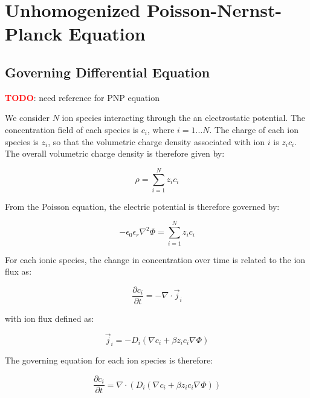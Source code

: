 
\section{Unhomogenized Poisson-Nernst-Planck Equation}\label{sec:unhom_pnp}

\subsection{Governing Differential Equation}\label{subsec:unhom_pnp_gov}


\textcolor{red}{\textbf{TODO}}: need reference for PNP equation

We consider $N$ ion species interacting through the an electrostatic potential.
The concentration field of each species is $c_i$, where $i=1 ... N$.
The charge of each ion species is $z_i$, so that the volumetric charge density associated
with ion $i$ is $z_i c_i$.
The overall volumetric charge density is therefore given by:

\begin{equation}
\rho = \sum_{i=1}^{N}z_i c_i
\end{equation}

From the Poisson equation, the electric potential is therefore governed by:

\begin{equation}
-\epsilon_{0}\epsilon_{r} \nabla^2 \Phi = \sum_{i=1}^{N}z_i c_i
\end{equation}

For each ionic species, the change in concentration over time is related to the ion flux as:

\begin{equation} 
\frac{\partial c_i}{\partial t} = - \nabla \cdot \vec{j}_i
\end{equation} 

with ion flux defined as:

\begin{equation}
\vec{j}_i  = -D_i \left( \nabla c_i + \beta z_i c_i \nabla \Phi \right)
\end{equation}

The governing equation for each ion species is therefore:

\begin{equation}
\frac{\partial c_i}{\partial t} = \nabla \cdot \left(
D_i \left( \nabla c_i + \beta z_i c_i \nabla \Phi \right)
\right)
\end{equation}

